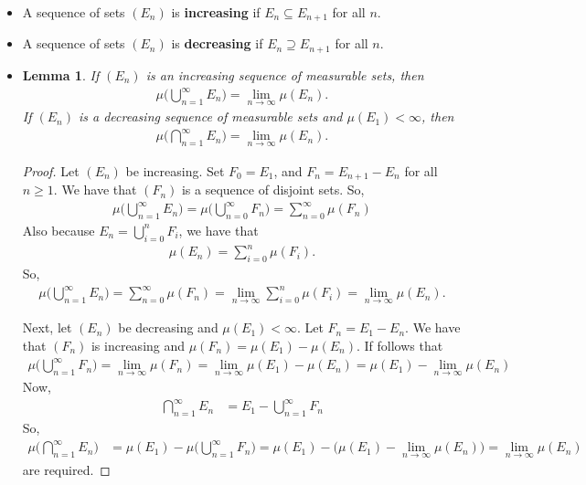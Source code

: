 \documentclass[10pt]{article}
\newtheorem{lemma}{Lemma}
\begin{document}
\begin{itemize}
  \item A sequence of sets $(E_n)$ is {\bf increasing} if $E_n \subseteq E_{n+1}$ for all $n$.
  
  \item A sequence of sets $(E_n)$ is {\bf decreasing} if $E_{n} \supseteq E_{n+1}$ for all $n$.
  
  \item \begin{lemma} \label{lemma:increasing-decreasing-limit}
  If $(E_n)$ is an increasing sequence of measurable sets, then
  \begin{align*}
      \mu\bigg( \bigcup_{n=1}^\infty E_n \bigg) = \lim_{n\rightarrow \infty} \mu(E_n).
  \end{align*}
  If $(E_n)$ is a decreasing sequence of measurable sets and $\mu(E_1) < \infty$, then
  \begin{align*}
    \mu\bigg( \bigcap_{n=1}^\infty E_n \bigg) = \lim_{n\rightarrow \infty} \mu(E_n).
  \end{align*}
  \end{lemma}

  \begin{proof}
    Let $(E_n)$ be increasing. Set $F_0 = E_1$, and $F_n = E_{n+1} - E_n$ for all $n \geq 1$. We have that $(F_n)$ is a sequence of disjoint sets. So,
    \begin{align*}
      \mu \bigg( \bigcup_{n=1}^\infty E_n \bigg)
      = \mu \bigg( \bigcup_{n=0}^\infty F_n \bigg)
      = \sum_{n=0}^\infty \mu(F_n)
    \end{align*}
    Also because $E_n = \bigcup_{i=0}^n F_i$, we have that
    \begin{align*}
        \mu(E_n) = \sum_{i=0}^n \mu(F_i).
    \end{align*}
    So,
    \begin{align*}
      \mu \bigg( \bigcup_{n=1}^\infty E_n \bigg)
      = \sum_{n=0}^\infty \mu(F_n)
      = \lim_{n \rightarrow \infty} \sum_{i=0}^n \mu(F_i)
      = \lim_{n \rightarrow \infty} \mu(E_n).
    \end{align*}

    Next, let $(E_n)$ be decreasing and $\mu(E_1) < \infty$. Let $F_n = E_1 - E_n$. We have that $(F_n)$ is increasing and $\mu(F_n) = \mu(E_1) - \mu(E_n)$. If follows that
    \begin{align*}
      \mu\bigg( \bigcup_{n=1}^\infty F_n \bigg) 
      = \lim_{n \rightarrow \infty} \mu(F_n) 
      = \lim_{n \rightarrow \infty} \mu(E_1) - \mu(E_n)
      = \mu(E_1) - \lim_{n \rightarrow \infty} \mu(E_n)
    \end{align*}
    Now, 
    \begin{align*}
      \bigcap_{n=1}^\infty E_n
      &= E_1 - \bigcup_{n=1}^\infty F_n
    \end{align*}
    So,
    \begin{align*}
      \mu\bigg( \bigcap_{n=1}^\infty E_n \bigg)
      &= \mu(E_1) - \mu\bigg( \bigcup_{n=1}^\infty F_n \bigg) 
      = \mu(E_1) - \bigg( \mu(E_1) - \lim_{n \rightarrow \infty} \mu(E_n) \bigg)
      = \lim_{n \rightarrow \infty} \mu(E_n)
    \end{align*}
    are required. 
  \end{proof}


\end{itemize}
\end{document}
